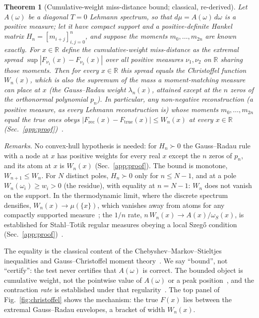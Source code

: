 \documentclass[aps,prb,onecolumn,superscriptaddress,longbibliography,floatfix]{revtex4-2}
\newtheorem{theorem}{Theorem}
\begin{document}
\begin{theorem}[Cumulative-weight miss-distance bound; classical, re-derived]
\label{thm:christoffel}
Let $A(\omega)$ be a diagonal $T=0$ Lehmann spectrum, so that ${d\mu=A(\omega)\,d\omega}$ is a positive measure; let it have compact support and a positive-definite Hankel matrix $H_n=[m_{i+j}]_{i,j=0}^{n}$, and suppose the moments $m_0,\dots,m_{2n}$ are known exactly. For $x\in\mathbb{R}$ define the cumulative-weight miss-distance as the extremal spread $\sup|F_{\nu_1}(x)-F_{\nu_2}(x)|$ over all positive measures $\nu_1,\nu_2$ on $\mathbb{R}$ sharing those moments. Then for every $x\in\mathbb{R}$ this spread equals the Christoffel function $W_n(x)$, which is also the supremum of the mass a moment-matching measure can place at $x$ (the Gauss--Radau weight $\lambda_n(x)$, attained except at the $n$ zeros of the orthonormal polynomial $p_n$). In particular, any non-negative reconstruction (a positive measure, as every Lehmann reconstruction is) whose moments $m_0,\dots,m_{2n}$ equal the true ones obeys $|F_{\mathrm{rec}}(x)-F_{\mathrm{true}}(x)|\le W_n(x)$ at every $x\in\mathbb{R}$ (Sec.~\ref{app:proof})~\cite{KarlinStudden1966,DetteStudden1997}.
\end{theorem}

\noindent\emph{Remarks.} No convex-hull hypothesis is needed: for $H_n\succ0$ the Gauss--Radau rule with a node at $x$ has positive weights for every real $x$ except the $n$ zeros of $p_n$, and its atom at $x$ is $W_n(x)$ (Sec.~\ref{app:proof}). The bound is monotone, $W_{n+1}\le W_n$. For $N$ distinct poles, $H_n\succ0$ only for $n\le N-1$, and at a pole $W_n(\omega_i)\ge w_i>0$ (the residue), with equality at $n=N-1$: $W_n$ does not vanish on the support. In the thermodynamic limit, where the discrete spectrum densifies, $W_n(x)\to\mu(\{x\})$, which vanishes away from atoms for any compactly supported measure~\cite{ShohatTamarkin1943,Nevai1986}; the $1/n$ rate, $n\,W_n(x)\to A(x)/\omega_S(x)$, is established for Stahl--Totik regular measures obeying a local Szeg\H{o} condition (Sec.~\ref{app:proof})~\cite{Totik2000,MNT1991}.

The equality is the classical content of the Chebyshev--Markov--Stieltjes inequalities and Gauss--Christoffel moment theory~\cite{GM2010,ShohatTamarkin1943,Akhiezer1965}. We say ``bound'', not ``certify'': the test never certifies that $A(\omega)$ is correct. The bounded object is cumulative weight, not the pointwise value of $A(\omega)$ or a peak position~\cite{GM2010}, and the contraction \emph{rate} is established under that regularity~\cite{Totik2000,MNT1991}. The top panel of Fig.~\ref{fig:christoffel} shows the mechanism: the true $F(x)$ lies between the extremal Gauss--Radau envelopes, a bracket of width $W_n(x)$.
\end{document}
